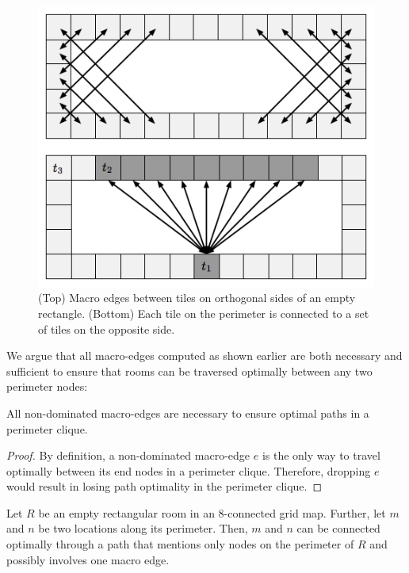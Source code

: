 \begin{figure}[tb]
       \begin{center}
                       \includegraphics[scale=0.5, trim = 10mm 10mm 10mm 0mm]{diagrams/macroedges.png}
       \end{center}
	\vspace{-3pt}
       \caption{(Top) Macro edges between tiles on orthogonal sides of an empty rectangle. 
(Bottom) Each tile on the perimeter is connected to a set of tiles on the opposite side.}
       \label{fig-macroedges}
\end{figure}

We argue that all macro-edges computed as shown earlier are both necessary and sufficient
to ensure that rooms can be traversed optimally between any two perimeter nodes:

\begin{proposition}
All non-dominated macro-edges are necessary to ensure optimal paths in a perimeter clique.
\end{proposition}
\begin{proof}
By definition, a non-dominated macro-edge $e$ is the only way to travel optimally between 
its end nodes in a perimeter clique. Therefore, dropping $e$ would result in losing path optimality
in the perimeter clique.
\end{proof}

\begin{lemma}
\label{lemma-rooms}
Let $R$ be an empty rectangular room in an 8-connected grid map.
Further, let $m$ and $n$ be two locations along its perimeter.
Then, $m$ and $n$ can be connected optimally through a path that mentions only nodes on the perimeter of $R$ and
possibly involves one macro edge.
\end{lemma}


